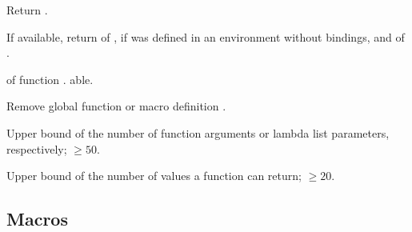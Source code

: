 \begin{LIST}{1cm}
  {
  Return .
  }

  {
  If available, return  of ,
  \retvalii{\NIL} if  was defined in an environment
  without bindings, and  of . 
  }

  {
   of function . able.
  }

  {
  Remove global function or macro definition .
  }

  {
  Upper bound of the number of function arguments or lambda list
  parameters, respectively; $\geq50$. 
  }

  {
  Upper bound of the number of values a function can return; $\geq20$.
  }

\end{LIST}


\subsection{Macros}

